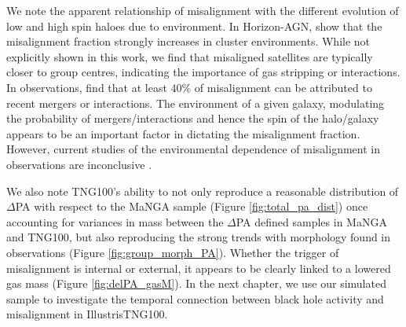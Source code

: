 We note the apparent relationship of misalignment with the different evolution of low and high spin haloes due to environment. In Horizon-AGN, \citet{khim2019} show that the misalignment fraction strongly increases in cluster environments. While not explicitly shown in this work, we find that misaligned satellites are typically closer to group centres, indicating the importance of gas stripping or interactions. In observations, \citet{li2019} find that at least 40\% of misalignment can be attributed to recent mergers or interactions. The environment of a given galaxy, modulating the probability of mergers/interactions and hence the spin of the halo/galaxy appears to be an important factor in dictating the misalignment fraction. However, current studies of the environmental dependence of misalignment in observations are inconclusive \citep[e.g. preference for misalignment in overdensity vs isolation; Chapter 5 vs][]{jin2016}.

We also note TNG100's ability to not only reproduce a reasonable distribution of $\Delta$PA with respect to the MaNGA sample (Figure \ref{fig:total_pa_dist}) once accounting for variances in mass between the $\Delta$PA defined samples in MaNGA and TNG100, but also reproducing the strong trends with morphology found in observations (Figure \ref{fig:group_morph_PA}). Whether the trigger of misalignment is internal or external, it appears to be clearly linked to a lowered gas mass (Figure \ref{fig:delPA_gasM}). In the next chapter, we use our simulated sample to investigate the temporal connection between black hole activity and misalignment in IllustrisTNG100. 